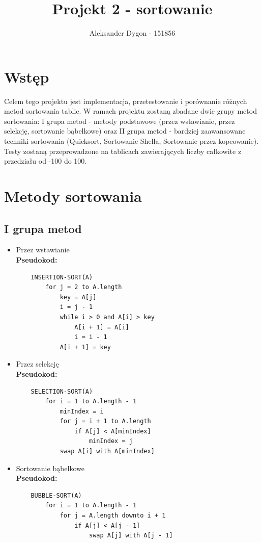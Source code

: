 \documentclass{article}
\title{Projekt 2 - sortowanie}
\author{Aleksander Dygon - 151856}
\date{}
\begin{document}
\maketitle

\section*{Wstęp}
Celem tego projektu jest implementacja, przetestowanie i porównanie różnych metod sortowania tablic. W ramach projektu zostaną zbadane dwie grupy metod sortowania: I grupa metod - metody podstawowe (przez wstawianie, przez selekcję, sortowanie bąbelkowe) oraz II grupa metod - bardziej zaawansowane techniki sortowania (Quicksort, Sortowanie Shella, Sortowanie przez kopcowanie). Testy zostaną przeprowadzone na tablicach zawierających liczby całkowite z przedziału od -100 do 100.

\section*{Metody sortowania}
\subsection*{I grupa metod}
\begin{itemize}
    \item Przez wstawianie\\
    \textbf{Pseudokod:}
    \begin{verbatim}
    INSERTION-SORT(A)
        for j = 2 to A.length
            key = A[j]
            i = j - 1
            while i > 0 and A[i] > key
                A[i + 1] = A[i]
                i = i - 1
            A[i + 1] = key
    \end{verbatim}
    
    \item Przez selekcję\\
    \textbf{Pseudokod:}
    \begin{verbatim}
    SELECTION-SORT(A)
        for i = 1 to A.length - 1
            minIndex = i
            for j = i + 1 to A.length
                if A[j] < A[minIndex]
                    minIndex = j
            swap A[i] with A[minIndex]
    \end{verbatim}
    
    \item Sortowanie bąbelkowe\\
    \textbf{Pseudokod:}
    \begin{verbatim}
    BUBBLE-SORT(A)
        for i = 1 to A.length - 1
            for j = A.length downto i + 1
                if A[j] < A[j - 1]
                    swap A[j] with A[j - 1]
    \end{verbatim}
\end{itemize}
\end{document}
